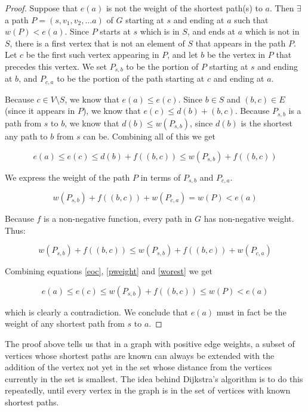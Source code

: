\documentclass[12pt,twoside]{reedthesis}
\begin{document}
\begin{proof}
Suppose that $e(a)$ is not the weight of the shortest path(s) to $a$. Then $\exists$ a path $P =(s, v_1, v_2, \ldots a)$ of $G$ starting at $s$ and ending at $a$ such that $w(P) < e(a)$. Since $P$ starts at $s$ which is in $S$, and ends at $a$ which is not in $S$, there is a first vertex that is not an element of $S$ that appears in the path $P$. Let $c$ be the first such vertex appearing in $P$, and let $b$ be the vertex in $P$ that precedes this vertex. We set $P_{s,b}$ to be the portion of $P$ starting at $s$ and ending at $b$, and $P_{c,a}$ to be the portion of the path starting at $c$ and ending at $a$.
\vspace{.5pc}

Because $c \in V \setminus S$, we know that $e(a) \leq e(c)$. Since $b \in S$ and $(b,c) \in E$ (since it appears in $P$), we know that $e(c) \leq d(b) + (b,c)$. Because $P_{s,b}$ is a path from $s$ to $b$, we know that $d(b) \leq w(P_{s,b})$, since $d(b)$ is the shortest any path to $b$ from $s$ can be. Combining all of this we get

\begin{equation}
e(a) \leq e(c) \leq d(b) + f((b,c)) \leq w(P_{s,b}) + f((b,c))
\label{eoc}
\end{equation}  

We express the weight of the path $P$ in terms of $P_{s,b}$ and $P_{c,a}$. 

\begin{equation}
w(P_{s,b}) + f((b,c)) + w(P_{c,a}) = w(P) < e(a)
\label{pweight}
\end{equation}

Because $f$ is a non-negative function, every path in $G$ has non-negative weight. Thus:

\begin{equation}
w(P_{s,b}) + f((b,c))  \leq w(P_{s,b}) + f((b,c)) + w(P_{c,a})
\label{worest}
\end{equation}

Combining equations \ref{eoc}, \ref{pweight} and \ref{worest} we get

$$
e(a) \leq e(c) \leq w(P_{s,b}) + f((b,c))  \leq w(P) < e(a)
$$

which is clearly a contradiction. We conclude that $e(a)$ must in fact be the weight of any shortest path from $s$ to $a$.
\end{proof}

\setlength{\parindent}{.5cm}

The proof above tells us that in a graph with positive edge weights, a subset of vertices whose shortest paths are known can always be extended with the addition of the vertex not yet in the set whose distance from the vertices currently in the set is smallest. The idea behind Dijkstra's algorithm is to do this repeatedly, until every vertex in the graph is in the set of vertices with known shortest paths.
\end{document}
